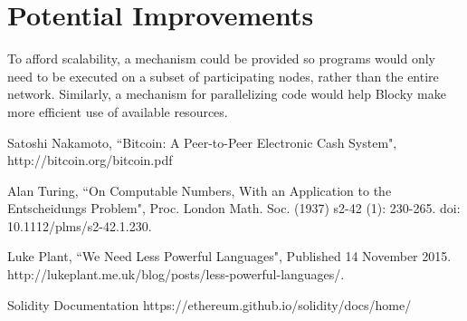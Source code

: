 \documentclass[letterpaper]{article}
\begin{document}
\section{Potential Improvements}
To afford scalability, a mechanism could be provided so programs would only need to be executed on a subset of participating nodes, rather than the entire network. Similarly, a mechanism for parallelizing code would help Blocky make more efficient use of available resources.

\begin{thebibliography}{9}

  Satoshi Nakamoto,
  ``Bitcoin: A Peer-to-Peer Electronic Cash System",
  http://bitcoin.org/bitcoin.pdf
  
  Alan Turing,
  ``On Computable Numbers, With an Application to the Entscheidungs Problem",
  Proc. London Math. Soc. (1937) s2-42 (1): 230-265.
  doi: 10.1112/plms/s2-42.1.230.
  
  Luke Plant,
  ``We Need Less Powerful Languages",
  Published 14 November 2015.
  http://lukeplant.me.uk/blog/posts/less-powerful-languages/.
  
  Solidity Documentation
  https://ethereum.github.io/solidity/docs/home/

\end{thebibliography}
  
\end{document}
